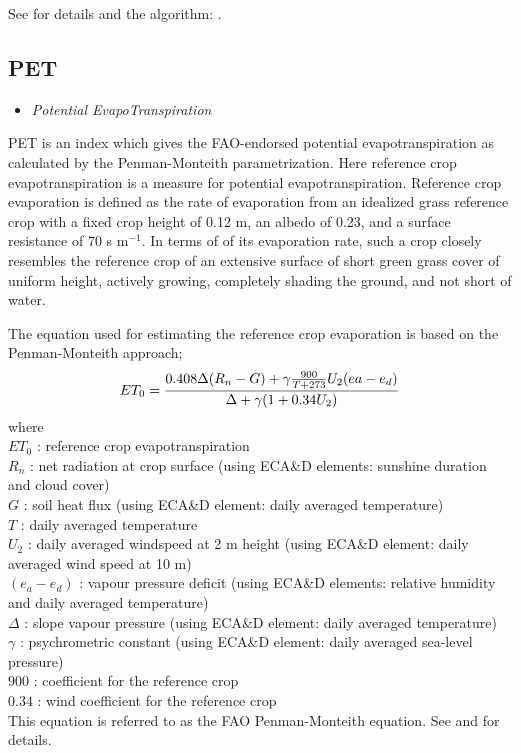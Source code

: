 \documentclass[a4paper,11pt]{article}
\begin{document}
See for details and the algorithm: \citet{guttman:99}.

\subsection*{PET}
\begin{itemize}
\item \textit{Potential EvapoTranspiration}
\end{itemize}
PET is an index which gives the FAO-endorsed potential evapotranspiration
as calculated by the Penman-Monteith parametrization. 
Here reference crop evapotranspiration is a measure for potential evapotranspiration.
Reference crop evaporation is defined as the rate of evaporation from an
idealized grass reference crop with a fixed crop height of 0.12 m, an albedo of 0.23, and
a surface resistance of 70 s m$^{-1}$. In terms of of its evaporation rate, such a crop closely resembles
the reference crop of an extensive surface of short green grass cover of uniform height,
actively growing, completely shading the ground, and not short of water.

The equation used for estimating the reference crop evaporation is based on the Penman-Monteith approach;
\begin{equation}
ET_0 = {0.408 \Delta (R_n - G) + \gamma {900 \over T + 273} U_2 ( ea - e_d) \over
\Delta + \gamma ( 1 + 0.34 U_2) } \notag
\end{equation}
where\\
$ET_0$ : reference crop evapotranspiration\\
$R_n$ : net radiation at crop surface (using ECA\&D elements: sunshine duration and cloud cover)\\
$G$ : soil heat flux (using ECA\&D element: daily averaged temperature)\\
$T$ : daily averaged temperature\\
$U_2$ : daily averaged windspeed at 2 m height (using ECA\&D element: daily averaged wind speed at 10 m)\\
$(e_a - e_d)$ : vapour pressure deficit (using ECA\&D elements: relative humidity and daily averaged temperature) \\
$\Delta$ : slope vapour pressure (using ECA\&D element: daily averaged temperature)\\
$\gamma$ : psychrometric constant (using ECA\&D element: daily averaged sea-level pressure)\\
$900$ : coefficient for the reference crop\\
$0.34$ : wind coefficient for the reference crop\\
This equation is referred to as the FAO Penman-Monteith equation. See \citet{allen:94a} and \citet{allen:94b}
for details.
\end{document}
